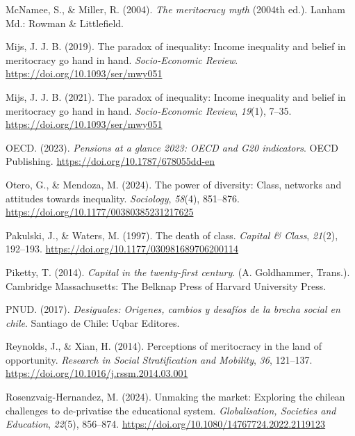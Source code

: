 \documentclass[
  12pt,
]{article}
\newlength{\cslhangindent}
\newenvironment{CSLReferences}[2] %
 {\begin{list}{}{%
  \setlength{\itemindent}{0pt}
  \setlength{\leftmargin}{0pt}
  \setlength{\parsep}{0pt}
  \ifodd #1
   \setlength{\leftmargin}{\cslhangindent}
   \setlength{\itemindent}{-1\cslhangindent}
  \fi
  \setlength{\itemsep}{#2\baselineskip}}}
 {\end{list}}
\begin{document}
\begin{CSLReferences}{1}{0}
McNamee, S., \& Miller, R. (2004). \emph{The meritocracy myth} (2004th
ed.). Lanham Md.: Rowman \& Littlefield.

Mijs, J. J. B. (2019). The paradox of inequality: Income inequality and
belief in meritocracy go hand in hand. \emph{Socio-Economic Review}.
\url{https://doi.org/10.1093/ser/mwy051}

Mijs, J. J. B. (2021). The paradox of inequality: Income inequality and
belief in meritocracy go hand in hand. \emph{Socio-Economic Review},
\emph{19}(1), 7--35. \url{https://doi.org/10.1093/ser/mwy051}

OECD. (2023). \emph{Pensions at a glance 2023: OECD and G20 indicators}.
OECD Publishing. \url{https://doi.org/10.1787/678055dd-en}

Otero, G., \& Mendoza, M. (2024). The power of diversity: Class,
networks and attitudes towards inequality. \emph{Sociology},
\emph{58}(4), 851--876. \url{https://doi.org/10.1177/00380385231217625}

Pakulski, J., \& Waters, M. (1997). The death of class. \emph{Capital \&
Class}, \emph{21}(2), 192--193.
\url{https://doi.org/10.1177/030981689706200114}

Piketty, T. (2014). \emph{Capital in the twenty-first century}. (A.
Goldhammer, Trans.). Cambridge Massachusetts: The Belknap Press of
Harvard University Press.

PNUD. (2017). \emph{Desiguales: Origenes, cambios y desafíos de la
brecha social en chile}. Santiago de Chile: Uqbar Editores.

Reynolds, J., \& Xian, H. (2014). Perceptions of meritocracy in the land
of opportunity. \emph{Research in Social Stratification and Mobility},
\emph{36}, 121--137. \url{https://doi.org/10.1016/j.rssm.2014.03.001}

Rosenzvaig-Hernandez, M. (2024). Unmaking the market: Exploring the
chilean challenges to de-privatise the educational system.
\emph{Globalisation, Societies and Education}, \emph{22}(5), 856--874.
\url{https://doi.org/10.1080/14767724.2022.2119123}


\end{CSLReferences}
\end{document}
